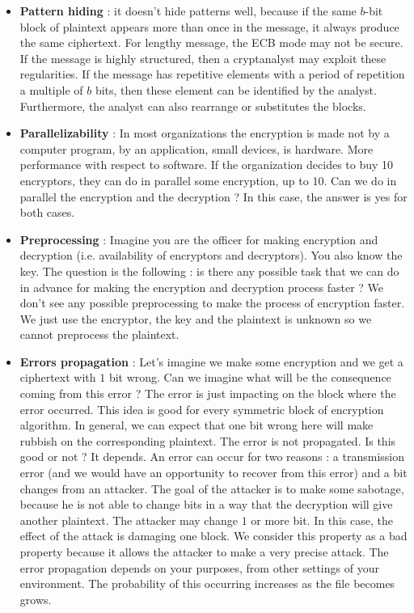 \documentclass[11pt]{article}
\begin{document}
\begin{itemize}
\item \textbf{Pattern hiding} : it doesn't hide patterns well, because if the same $b$-bit block of plaintext appears more than once in the message, it always produce the same ciphertext. For lengthy message, the ECB mode may not be secure. If the message is highly structured, then a cryptanalyst may exploit these regularities. If the message has repetitive elements with a period of repetition a multiple of $b$ bits, then these element can be identified by the analyst. Furthermore, the analyst can also rearrange or substitutes the blocks. 
\item \textbf{Parallelizability} : In most organizations the encryption is made not by a computer program, by an application, small devices, is hardware. More performance with respect to software. If the organization decides to buy 10 encryptors, they can do in parallel some encryption, up to 10. Can we do in parallel the encryption and the decryption ? In this case, the answer is yes for both cases.
\item \textbf{Preprocessing} : Imagine you are the officer for making encryption and decryption (i.e. availability of encryptors and decryptors). You also know the key. The question is the following : is there any possible task that we can do in advance for making the encryption and decryption process faster ? We don't see any possible preprocessing to make the process of encryption faster. We just use the encryptor, the key and the plaintext is unknown so we cannot preprocess the plaintext.
\item \textbf{Errors propagation} : Let's imagine we make some encryption and we get a ciphertext with $1$ bit wrong. Can we imagine what will be the consequence coming from this error ? The error is just impacting on the block where the error occurred. This idea is good for every symmetric block of encryption algorithm. In general, we can expect that one bit wrong here will make rubbish on the corresponding plaintext. The error is not propagated. Is this good or not ? It depends. An error can occur for two reasons : a transmission error (and we would have an opportunity to recover from this error) and a bit changes from an attacker. The goal of the attacker is to make some sabotage, because he is not able to change bits in a way that the decryption will give another plaintext. The attacker may change $1$ or more bit. In this case, the effect of the attack is damaging one block. We consider this property as a bad property because it allows the attacker to make a very precise attack. The error propagation depends on your purposes, from other settings of your environment. The probability of this occurring increases as the file becomes grows.
\end{itemize}
\end{document}
